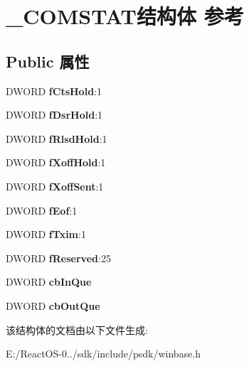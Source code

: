 \hypertarget{struct___c_o_m_s_t_a_t}{}\section{\+\_\+\+C\+O\+M\+S\+T\+A\+T结构体 参考}
\label{struct___c_o_m_s_t_a_t}
\subsection*{Public 属性}
\begin{DoxyCompactItemize}
\item 
\mbox{\label{struct___c_o_m_s_t_a_t_a4cfdede71438ee092a8c1314cbb9e2a6}} 
D\+W\+O\+RD {\bfseries f\+Cts\+Hold}\+:1
\item 
\mbox{\label{struct___c_o_m_s_t_a_t_ae86470ad31e1946101122ff6ad522330}} 
D\+W\+O\+RD {\bfseries f\+Dsr\+Hold}\+:1
\item 
\mbox{\label{struct___c_o_m_s_t_a_t_a21502881ebb5c70649a6da2a3a20218c}} 
D\+W\+O\+RD {\bfseries f\+Rlsd\+Hold}\+:1
\item 
\mbox{\label{struct___c_o_m_s_t_a_t_ac2f27cd1928bdaffc69b8c056a3d2b56}} 
D\+W\+O\+RD {\bfseries f\+Xoff\+Hold}\+:1
\item 
\mbox{\label{struct___c_o_m_s_t_a_t_a4f44d41856df0f6305970e73e0c7e34b}} 
D\+W\+O\+RD {\bfseries f\+Xoff\+Sent}\+:1
\item 
\mbox{\label{struct___c_o_m_s_t_a_t_a654f9b8724b33a95dc27034f165fab23}} 
D\+W\+O\+RD {\bfseries f\+Eof}\+:1
\item 
\mbox{\label{struct___c_o_m_s_t_a_t_ae017babc71d718d47b35404ffef06026}} 
D\+W\+O\+RD {\bfseries f\+Txim}\+:1
\item 
\mbox{\label{struct___c_o_m_s_t_a_t_a6fcf6fd0029e3853cf46015fff5174fa}} 
D\+W\+O\+RD {\bfseries f\+Reserved}\+:25
\item 
\mbox{\label{struct___c_o_m_s_t_a_t_a5a68d7e1a64b70921cdcf07777a78816}} 
D\+W\+O\+RD {\bfseries cb\+In\+Que}
\item 
\mbox{\label{struct___c_o_m_s_t_a_t_ae4f9b916ff918262ac8b932692928a9c}} 
D\+W\+O\+RD {\bfseries cb\+Out\+Que}
\end{DoxyCompactItemize}


该结构体的文档由以下文件生成\+:\begin{DoxyCompactItemize}
\item 
E\+:/\+React\+O\+S-\/0../sdk/include/psdk/winbase.\+h\end{DoxyCompactItemize}
